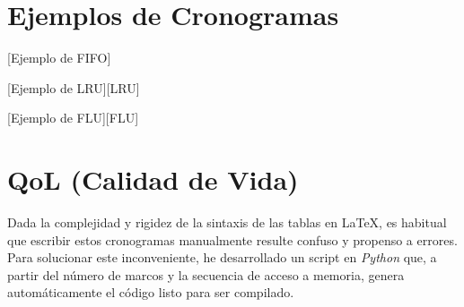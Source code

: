 \documentclass[11pt,a4paper]{article}
\begin{document}
\newpage
\section{Ejemplos de Cronogramas}

[Ejemplo de FIFO]


\endfifo

[Ejemplo de LRU][LRU]


\endfifo
\newpage

[Ejemplo de FLU][FLU]


\endfifo

\section{QoL (Calidad de Vida)}
Dada la complejidad y rigidez de la sintaxis de las tablas en \LaTeX{}, es habitual que escribir estos cronogramas manualmente resulte confuso y propenso a errores. Para solucionar este inconveniente, he desarrollado un script en \textit{Python} que, a partir del número de marcos y la secuencia de acceso a memoria, genera automáticamente el código listo para ser compilado.
\end{document}
